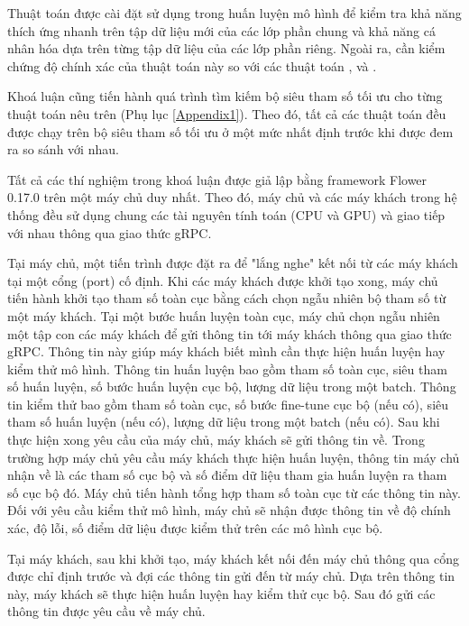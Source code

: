 Thuật toán  được cài đặt sử dụng trong huấn luyện mô hình để kiểm tra khả năng thích ứng nhanh trên tập dữ liệu mới của các lớp phần chung và khả năng cá nhân hóa dựa trên từng tập dữ liệu của các lớp phần riêng. Ngoài ra, cần kiểm chứng độ chính xác của thuật toán này so với các thuật toán ,  và .

Khoá luận cũng tiến hành quá trình tìm kiếm bộ siêu tham số tối ưu cho từng thuật toán nêu trên (Phụ lục \ref{Appendix1}). Theo đó, tất cả các thuật toán đều được chạy trên bộ siêu tham số tối ưu ở một mức nhất định trước khi được đem ra so sánh với nhau.

Tất cả các thí nghiệm trong khoá luận được giả lập bằng framework Flower 0.17.0 \cite{beutel2020flower} trên một máy chủ duy nhất. Theo đó, máy chủ và các máy khách trong hệ thống đều sử dụng chung các tài nguyên tính toán (CPU và GPU) và giao tiếp với nhau thông qua giao thức gRPC.

Tại máy chủ, một tiến trình được đặt ra để "lắng nghe" kết nối từ các máy khách tại một cổng (port) cố định. Khi các máy khách được khởi tạo xong, máy chủ tiến hành khởi tạo tham số toàn cục bằng cách chọn ngẫu nhiên bộ tham số từ một máy khách. Tại một bước huấn luyện toàn cục, máy chủ chọn ngẫu nhiên một tập con các máy khách để gửi thông tin tới máy khách thông qua giao thức gRPC. Thông tin này giúp máy khách biết mình cần thực hiện huấn luyện hay kiểm thử mô hình. Thông tin huấn luyện bao gồm tham số toàn cục, siêu tham số huấn luyện, số bước huấn luyện cục bộ, lượng dữ liệu trong một batch. Thông tin kiểm thử bao gồm tham số toàn cục, số bước fine-tune cục bộ (nếu có), siêu tham số huấn luyện (nếu có), lượng dữ liệu trong một batch (nếu có). Sau khi thực hiện xong yêu cầu của máy chủ, máy khách sẽ gửi thông tin về. Trong trường hợp máy chủ yêu cầu máy khách thực hiện huấn luyện, thông tin máy chủ nhận về là các tham số cục bộ và số điểm dữ liệu tham gia huấn luyện ra tham số cục bộ đó. Máy chủ tiến hành tổng hợp tham số toàn cục từ các thông tin này. Đối với yêu cầu kiểm thử mô hình, máy chủ sẽ nhận được thông tin về độ chính xác, độ lỗi, số điểm dữ liệu được kiểm thử trên các mô hình cục bộ.

Tại máy khách, sau khi khởi tạo, máy khách kết nối đến máy chủ thông qua cổng được chỉ định trước và đợi các thông tin gửi đến từ máy chủ. Dựa trên thông tin này, máy khách sẽ thực hiện huấn luyện hay kiểm thử cục bộ. Sau đó gửi các thông tin được yêu cầu về máy chủ.
